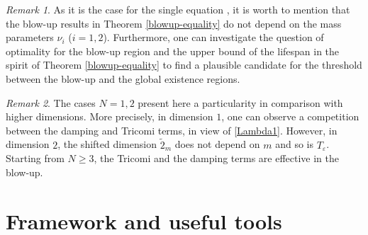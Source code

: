 \documentclass[12pt,leqno]{amsart}
\numberwithin{equation}{section}
\theoremstyle{remark}
\newtheorem{rem}{Remark}[section]
\def\e{{\varepsilon}}
\begin{document}
\begin{rem}
As it is the case for the single equation \cite{Our3}, it is worth to mention that the blow-up results in Theorem \ref{blowup-equality}  do not depend on the mass parameters $\nu_i$ ($i=1,2$). Furthermore, one can investigate the question of optimality for the blow-up region and the upper bound of the lifespan in the spirit of Theorem \ref{blowup-equality}  to find a plausible candidate for the threshold  between the blow-up and the global existence regions.
\end{rem}


\begin{rem}
The cases $N=1,2$ present here a particularity in comparison with higher dimensions. More precisely, in dimension $1$, one can observe  a competition between the damping and Tricomi terms, in view of \eqref{Lambda1}. However, in dimension $2$, the shifted dimension $\tilde{2}_m$ does not depend on $m$ and so is $T_\e$. Starting from $N \ge 3$, the Tricomi and the damping terms  are effective in the blow-up.
\end{rem}





\section{Framework and useful tools}\label{aux}
\par
\end{document}
